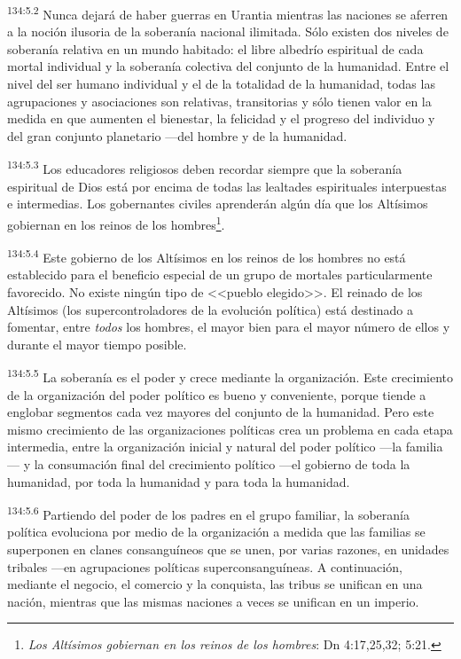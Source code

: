 \par 
\textsuperscript{134:5.2} Nunca dejará de haber guerras en Urantia mientras las naciones se aferren a la noción ilusoria de la soberanía nacional ilimitada. Sólo existen dos niveles de soberanía relativa en un mundo habitado: el libre albedrío espiritual de cada mortal individual y la soberanía colectiva del conjunto de la humanidad. Entre el nivel del ser humano individual y el de la totalidad de la humanidad, todas las agrupaciones y asociaciones son relativas, transitorias y sólo tienen valor en la medida en que aumenten el bienestar, la felicidad y el progreso del individuo y del gran conjunto planetario ---del hombre y de la humanidad.

\par 
\textsuperscript{134:5.3} Los educadores religiosos deben recordar siempre que la soberanía espiritual de Dios está por encima de todas las lealtades espirituales interpuestas e intermedias. Los gobernantes civiles aprenderán algún día que los Altísimos gobiernan en los reinos de los hombres\footnote{\textit{Los Altísimos gobiernan en los reinos de los hombres}: Dn 4:17,25,32; 5:21.}.

\par 
\textsuperscript{134:5.4} Este gobierno de los Altísimos en los reinos de los hombres no está establecido para el beneficio especial de un grupo de mortales particularmente favorecido. No existe ningún tipo de <<pueblo elegido>>. El reinado de los Altísimos (los supercontroladores de la evolución política) está destinado a fomentar, entre \textit{todos} los hombres, el mayor bien para el mayor número de ellos y durante el mayor tiempo posible.

\par 
\textsuperscript{134:5.5} La soberanía es el poder y crece mediante la organización. Este crecimiento de la organización del poder político es bueno y conveniente, porque tiende a englobar segmentos cada vez mayores del conjunto de la humanidad. Pero este mismo crecimiento de las organizaciones políticas crea un problema en cada etapa intermedia, entre la organización inicial y natural del poder político ---la familia--- y la consumación final del crecimiento político ---el gobierno de toda la humanidad, por toda la humanidad y para toda la humanidad.

\par 
\textsuperscript{134:5.6} Partiendo del poder de los padres en el grupo familiar, la soberanía política evoluciona por medio de la organización a medida que las familias se superponen en clanes consanguíneos que se unen, por varias razones, en unidades tribales ---en agrupaciones políticas superconsanguíneas. A continuación, mediante el negocio, el comercio y la conquista, las tribus se unifican en una nación, mientras que las mismas naciones a veces se unifican en un imperio.

